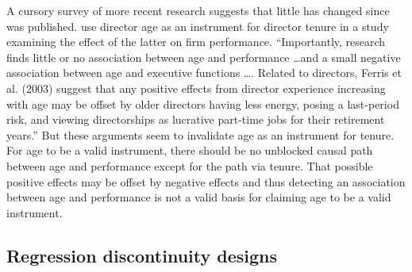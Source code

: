 A cursory survey of more recent research suggests that little has changed since \citet{Larcker:2010fq} was published. \citet{Kim:2014fm} use director age as an instrument for director tenure in a study examining the effect of the latter on firm performance. 
``Importantly, research finds little or no association between age and performance \dots and a small negative association between age and executive functions \dots. 
Related to directors, Ferris et al. (2003) suggest that any positive effects from director experience increasing with age may be offset by older directors having less energy, posing a last-period risk, and viewing directorships as lucrative part-time jobs for their retirement years.'' 
But these arguments seem to invalidate age as an instrument for tenure. 
For age to be a valid instrument, there should be no unblocked causal path between age and performance except for the path via tenure.
 That possible positive effects may be offset by negative effects and thus detecting an association between age and performance is not a valid basis for claiming age to be a valid instrument.

\subsection{Regression discontinuity designs}